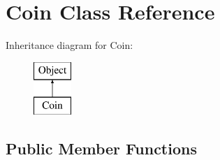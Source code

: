 \hypertarget{class_coin}{}\section{Coin Class Reference}
\label{class_coin}
Inheritance diagram for Coin\+:\begin{figure}[H]
\begin{center}
\leavevmode
\includegraphics[height=2.000000cm]{class_coin}
\end{center}
\end{figure}
\subsection*{Public Member Functions}
